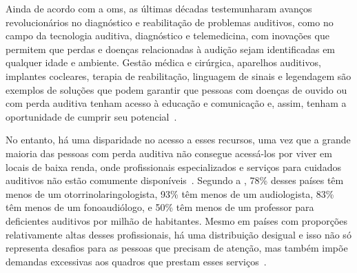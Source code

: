 Ainda de acordo com a \acrshort{oms}, as últimas décadas testemunharam avanços revolucionários no diagnóstico e reabilitação de problemas auditivos, como no campo da tecnologia auditiva, diagnóstico e telemedicina, com inovações que permitem que perdas e doenças relacionadas à audição sejam identificadas em qualquer idade e ambiente. Gestão médica e cirúrgica, aparelhos auditivos, implantes cocleares, terapia de reabilitação, linguagem de sinais e legendagem são exemplos de soluções que podem garantir que pessoas com doenças de ouvido ou com perda auditiva tenham acesso à educação e comunicação e, assim, tenham a oportunidade de cumprir seu potencial~\cite{who-2021-report-hearing}.



No entanto, há uma disparidade no acesso a esses recursos, uma vez que a grande maioria das pessoas com perda auditiva não consegue acessá-los por viver em locais de baixa renda, onde profissionais especializados e serviços para cuidados auditivos não estão comumente disponíveis~\cite{who-2021-report-hearing}. Segundo a \citeauthor{opas-2021-oms-estima}, 78\% desses países têm menos de um otorrinolaringologista, 93\% têm menos de um audiologista, 83\% têm menos de um fonoaudiólogo, e 50\% têm menos de um professor para deficientes auditivos por milhão de habitantes. Mesmo em países com proporções relativamente altas desses profissionais, há uma distribuição desigual e isso não só representa desafios para as pessoas que precisam de atenção, mas também impõe demandas excessivas aos quadros que prestam esses serviços~\cite{opas-2021-oms-estima}.


